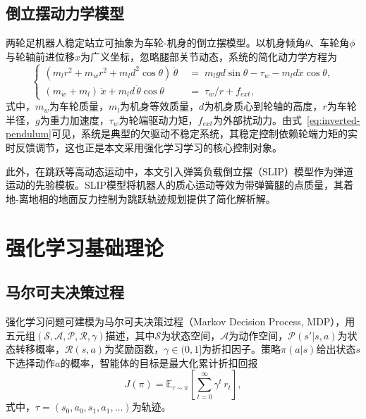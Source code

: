 \subsection{倒立摆动力学模型}

两轮足机器人稳定站立可抽象为车轮-机身的倒立摆模型。以机身倾角$\theta$、车轮角$\phi$与轮轴前进位移$x$为广义坐标，忽略腿部关节动态，系统的简化动力学方程为
\begin{equation}
  \left\{
    \begin{aligned}
      (m_l r^2 + m_w r^2 + m_l d^2\cos\theta)\,\ddot{\theta} &\;=\; m_l g d \sin\theta - \tau_w - m_l d \ddot{x} \cos\theta, \\
      (m_w + m_l)\,\ddot{x} + m_l d\,\ddot{\theta}\cos\theta &\;=\; \tau_w / r + f_{ext},
    \end{aligned}
  \right.
  \label{eq:inverted-pendulum}
\end{equation}
式中，$m_w$为车轮质量，$m_l$为机身等效质量，$d$为机身质心到轮轴的高度，$r$为车轮半径，$g$为重力加速度，$\tau_w$为轮端驱动力矩，$f_{ext}$为外部扰动力。由式~\eqref{eq:inverted-pendulum}可见，系统是典型的欠驱动不稳定系统，其稳定控制依赖轮端力矩的实时反馈调节，这也正是本文采用强化学习学习的核心控制对象。

此外，在跳跃等高动态运动中，本文引入弹簧负载倒立摆（SLIP）模型作为弹道运动的先验模板\cite{blickhan1989,geyer2006}。SLIP模型将机器人的质心运动等效为带弹簧腿的点质量，其着地-离地相的地面反力控制为跳跃轨迹规划提供了简化解析解。

\section{强化学习基础理论}

\subsection{马尔可夫决策过程}

强化学习问题可建模为马尔可夫决策过程（Markov Decision Process, MDP），用五元组$\left(\mathcal{S},\mathcal{A},\mathcal{P},\mathcal{R},\gamma\right)$描述，其中$\mathcal{S}$为状态空间，$\mathcal{A}$为动作空间，$\mathcal{P}(s'|s,a)$为状态转移概率，$\mathcal{R}(s,a)$为奖励函数，$\gamma\in(0,1]$为折扣因子\cite{sutton1998}。策略$\pi(a|s)$给出状态$s$下选择动作$a$的概率，智能体的目标是最大化累计折扣回报
\begin{equation}
  J(\pi) = \mathbb{E}_{\tau \sim \pi}\left[\sum_{t=0}^{\infty}\gamma^t\,r_t\right],
  \label{eq:mdp-objective}
\end{equation}
式中，$\tau = (s_0,a_0,s_1,a_1,\ldots)$为轨迹。

